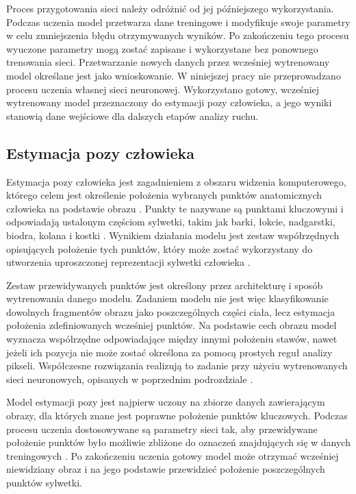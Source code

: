 Proces przygotowania sieci należy odróżnić od jej późniejszego wykorzystania. Podczas uczenia model przetwarza dane treningowe i modyfikuje swoje parametry w celu zmniejszenia błędu otrzymywanych wyników. Po zakończeniu tego procesu wyuczone parametry mogą zostać zapisane i wykorzystane bez ponownego trenowania sieci. Przetwarzanie nowych danych przez wcześniej wytrenowany model określane jest jako wnioskowanie. W niniejszej pracy nie przeprowadzano procesu uczenia własnej sieci neuronowej. Wykorzystano gotowy, wcześniej wytrenowany model przeznaczony do estymacji pozy człowieka, a jego wyniki stanowią dane wejściowe dla dalszych etapów analizy ruchu.

\subsection{Estymacja pozy człowieka}

Estymacja pozy człowieka jest zagadnieniem z obszaru widzenia komputerowego, którego celem jest określenie położenia wybranych punktów anatomicznych człowieka na podstawie obrazu \cite{chen2020monocular}. Punkty te nazywane są punktami kluczowymi i odpowiadają ustalonym częściom sylwetki, takim jak barki, łokcie, nadgarstki, biodra, kolana i kostki \cite{mediapipe_pose_docs}. Wynikiem działania modelu jest zestaw współrzędnych opisujących położenie tych punktów, który może zostać wykorzystany do utworzenia uproszczonej reprezentacji sylwetki człowieka \cite{mediapipe_pose_landmarker}.

Zestaw przewidywanych punktów jest określony przez architekturę i sposób wytrenowania danego modelu. Zadaniem modelu nie jest więc klasyfikowanie dowolnych fragmentów obrazu jako poszczególnych części ciała, lecz estymacja położenia zdefiniowanych wcześniej punktów. Na podstawie cech obrazu model wyznacza współrzędne odpowiadające między innymi położeniu stawów, nawet jeżeli ich pozycja nie może zostać określona za pomocą prostych reguł analizy pikseli. Współczesne rozwiązania realizują to zadanie przy użyciu wytrenowanych sieci neuronowych, opisanych w poprzednim podrozdziale \cite{chen2020monocular}.

Model estymacji pozy jest najpierw uczony na zbiorze danych zawierającym obrazy, dla których znane jest poprawne położenie punktów kluczowych. Podczas procesu uczenia dostosowywane są parametry sieci tak, aby przewidywane położenie punktów było możliwie zbliżone do oznaczeń znajdujących się w danych treningowych \cite{chen2020monocular}. Po zakończeniu uczenia gotowy model może otrzymać wcześniej niewidziany obraz i na jego podstawie przewidzieć położenie poszczególnych punktów sylwetki.

